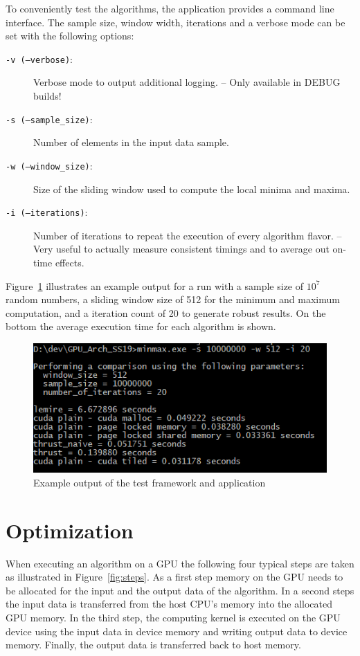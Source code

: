 To conveniently test the algorithms, the application provides a command line interface. The sample size, window width, iterations and a verbose mode can be set with the following options:

\begin{description}
    \item[\texttt{-v (--verbose)}:] 
        Verbose mode to output additional logging. -- Only available in DEBUG builds!
    \item[\texttt{-s (--sample\_size)}:] 
        Number of elements in the input data sample.
    \item[\texttt{-w (--window\_size)}:]
        Size of the sliding window used to compute the local minima and maxima.
    \item[\texttt{-i (--iterations)}:] 
        Number of iterations to repeat the execution of every algorithm flavor. -- Very useful to actually measure consistent timings and to average out on-time effects.
\end{description}

Figure~\ref{fig:exampleoutput} illustrates an example output for a run with a sample size of $10^7$ random numbers, a sliding window size of 512 for the minimum and maximum computation, and a iteration count of 20 to generate robust results. On the bottom the average execution time for each algorithm is shown.

\begin{figure}[h]
    \centering
    \includegraphics[width=0.8\linewidth]{Figures/exampleoutput}
    \caption{Example output of the test framework and application}
    \label{fig:exampleoutput}
\end{figure}

\section{Optimization}

When executing an algorithm on a GPU the following four typical steps are taken as illustrated in Figure~\ref{fig:steps}. As a first step memory on the GPU needs to be allocated for the input and the output data of the algorithm. In a second steps the input data is transferred from the host CPU's memory into the allocated GPU memory. In the third step, the computing kernel is executed on the GPU device using the input data in device memory and writing output data to device memory. Finally, the output data is transferred back to host memory.

